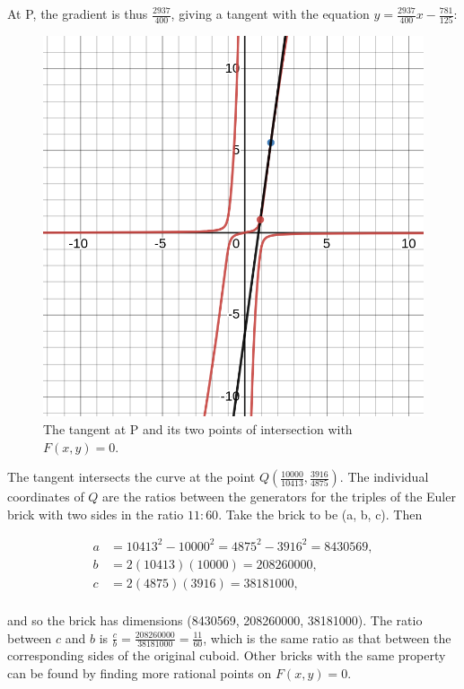\documentclass[11pt]{article}
\begin{document}
At P, the gradient is thus $\frac{2937}{400}$, giving a tangent with the equation $y=\frac{2937}{400}x-\frac{781}{125}$:
\begin{figure}[H]
	\centering
	\includegraphics[scale=0.25]{5.png}
	\caption{The tangent at P and its two points of intersection with $F(x,y)=0$.}
\end{figure}

The tangent intersects the curve at the point $Q(\frac{10000}{10413}, \frac{3916}{4875})$. The individual coordinates of $Q$ are the ratios between the generators for the triples of the Euler brick with two sides in the ratio $11:60$. Take the brick to be (a, b, c). Then

\begin{equation*}
\begin{aligned}
a&=10413^2-10000^2=4875^2-3916^2=8430569, \\
b&=2(10413)(10000)=208260000, \\
c&=2(4875)(3916)=38181000, \\
\end{aligned}
\end{equation*}

and so the brick has dimensions (8430569, 208260000, 38181000). The ratio between $c$ and $b$ is $\frac{c}{b}=\frac{208260000}{38181000}=\frac{11}{60}$, which is the same ratio as that between the corresponding sides of the original cuboid. Other bricks with the same property can be found by finding more rational points on $F(x,y)=0$.
\end{document}
